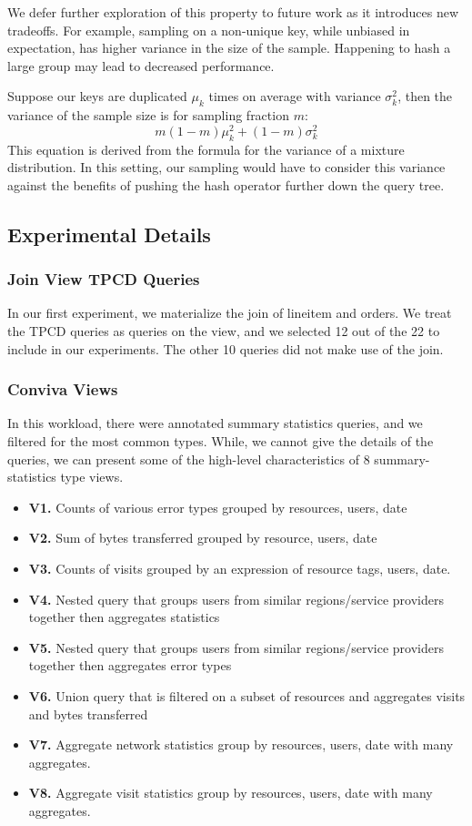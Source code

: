 We defer further exploration of this property to future work as it introduces new tradeoffs.
For example, sampling on a non-unique key, while unbiased in expectation, has higher variance in the size of the sample.
Happening to hash a large group may lead to decreased performance. 

Suppose our keys are duplicated $\mu_k$ times on average with variance $\sigma_k^2$, then the variance of the
sample size is for sampling fraction $m$:
\[m(1-m)\mu_k^2+(1-m)\sigma_k^2\]
This equation is derived from the formula for the variance of a mixture distribution.
In this setting, our sampling would have to consider this variance against the benefits of pushing the hash operator further down the query tree. 

\subsection{Experimental Details}

\subsubsection{Join View TPCD Queries}
In our first experiment, we materialize the join of lineitem and orders.
We treat the TPCD queries as queries on the view, and we selected 12 out of the 22 to include in our experiments.
The other 10 queries did not make use of the join.

\subsubsection{Conviva Views}
In this workload, there were annotated summary statistics queries, and we filtered for the most common types.
While, we cannot give the details of the queries, we can present some of the high-level characteristics of 8 summary-statistics type views. 
\begin{itemize} 
\item \textbf{V1.} Counts of various error types grouped by resources, users, date
\item \textbf{V2.} Sum of bytes transferred grouped by resource, users, date
\item \textbf{V3.} Counts of visits grouped by an expression of resource tags, users, date.
\item \textbf{V4.} Nested query that groups users from similar regions/service providers together then aggregates statistics
\item \textbf{V5.} Nested query that groups users from similar regions/service providers together then aggregates error types
\item \textbf{V6.} Union query that is filtered on a subset of resources and aggregates visits and bytes transferred
\item \textbf{V7.} Aggregate network statistics group by resources, users, date with many aggregates.
\item \textbf{V8.} Aggregate visit statistics group by resources, users, date with many aggregates.
\end{itemize}

